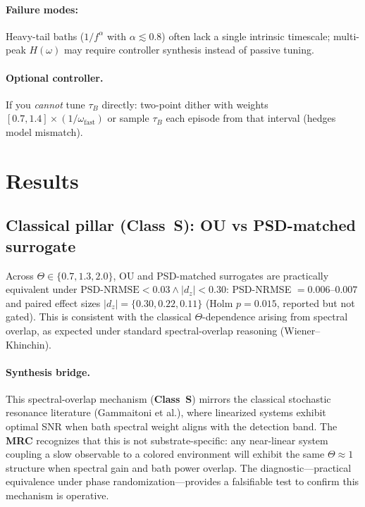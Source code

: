 \documentclass[11pt,letterpaper]{article}
\DeclareRobustCommand{\mrc}{\textbf{MRC}\xspace}
\DeclareRobustCommand{\classS}{\textbf{Class~S}\xspace}
\DeclareRobustCommand{\GatePSD}{\ensuremath{\text{PSD-NRMSE}<0.03}\xspace}
\DeclareRobustCommand{\GateDZ}{\ensuremath{\lvert d_z\rvert<0.30}\xspace}
\DeclareRobustCommand{\GateEQ}{\ensuremath{\GatePSD \wedge \GateDZ}\xspace}
\begin{document}
\begin{tcolorbox}[colback=blue!5!white,colframe=blue!75!black,title=Design Card: Memory-Resonance Condition ($\Theta \approx 1$)]
\paragraph*{Failure modes:}
Heavy-tail baths ($1/f^\alpha$ with $\alpha\!\lesssim\!0.8$) often lack a single intrinsic timescale; multi-peak $H(\omega)$ may require controller synthesis instead of passive tuning.

\paragraph*{Optional controller.}
If you \emph{cannot} tune $\tau_B$ directly: two-point dither with weights $[0.7, 1.4]\times(1/\omega_{\mathrm{fast}})$ or sample $\tau_B$ each episode from that interval (hedges model mismatch).

\end{tcolorbox}

\clearpage
\section{Results}
\subsection{Classical pillar (\classS): OU vs PSD-matched surrogate}
Across $\Theta\in\{0.7,1.3,2.0\}$, OU and PSD-matched surrogates are practically equivalent under \GateEQ: PSD-NRMSE $=0.006$--$0.007$ and paired effect sizes $|d_z|=\{0.30,0.22,0.11\}$ (Holm $p=0.015$, reported but not gated). This is consistent with the classical $\Theta$-dependence arising from spectral overlap, as expected under standard spectral-overlap reasoning (Wiener--Khinchin).

\paragraph*{Synthesis bridge.} This spectral-overlap mechanism (\classS) mirrors the classical stochastic resonance literature (Gammaitoni et al.), where linearized systems exhibit optimal SNR when bath spectral weight aligns with the detection band. The \mrc recognizes that this is not substrate-specific: any near-linear system coupling a slow observable to a colored environment will exhibit the same $\Theta\!\approx\!1$ structure when spectral gain and bath power overlap. The diagnostic---practical equivalence under phase randomization---provides a falsifiable test to confirm this mechanism is operative.
\end{document}
